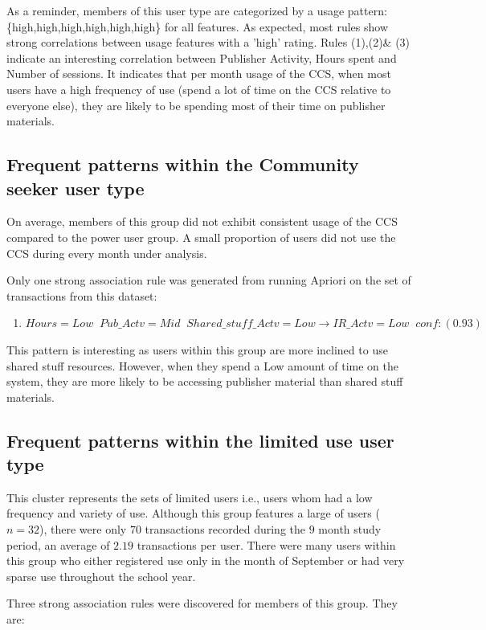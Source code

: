 \documentclass{acm_proc_article-sp}
\begin{document}
As a reminder, members of this user type  are categorized by a usage pattern: \{high,high,high,high,high,high\} for all features.
As expected, most rules show strong correlations between usage features with a 'high' rating.
Rules (1),(2)\& (3) indicate an interesting correlation between Publisher Activity, Hours spent and Number of sessions. It indicates that per month usage of the CCS, when most users have a high frequency of use (spend a lot of time on the CCS relative to everyone else), they are likely to be spending most of their time on publisher materials.

\subsection {Frequent patterns within the Community seeker user type}
On average, members of this group did not exhibit consistent usage of the CCS compared to the power user group. A small proportion of users did not use the CCS during every month under analysis.

Only one strong association rule was generated from running Apriori on the set of transactions from this dataset:

\begin{enumerate}
\item $Hours=Low \;\; Pub\_Actv=Mid \;\; Shared\_stuff\_Actv=Low  \longrightarrow IR\_Actv=Low  \;\;  conf:(0.93)$
\end{enumerate}

This pattern is interesting as users within this group are more inclined to use shared stuff resources. However, when they spend a Low amount of time on the system, they are more likely to be accessing publisher material than shared stuff materials.

\subsection {Frequent patterns within the limited use user type}
This cluster represents the sets of limited users i.e., users whom had a low frequency and variety of use. 
Although this group features a large of users ($n=32$), there were only $70$ transactions recorded during the $9$ month study period, an average of $2.19$ transactions per user. There were many users within this group who either registered use only in the month of September or had very sparse use throughout the school year.

Three strong association rules were discovered for members of this group. They are:
\end{document}
